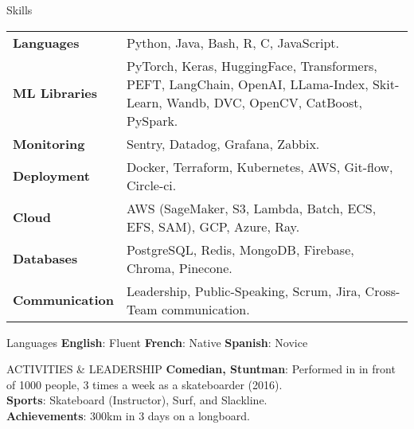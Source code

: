 \documentclass{resume}
\begin{document}
\begin{multicols}{2}
	\begin{rSection}{\Large Skills}
		\noindent
		 \setlength{\tabcolsep}{2pt}
    \begin{tabularx}{0.50\textwidth}{@{\textbullet\hspace{\labelsep}}lX}
        \textbf{Languages} & Python, Java, Bash, R, C, JavaScript. \\
        \textbf{ML Libraries} & PyTorch, Keras, HuggingFace, Transformers, PEFT, LangChain, OpenAI, LLama-Index, Skit-Learn, Wandb, DVC, OpenCV, CatBoost, PySpark. \\
        \textbf{Monitoring} & Sentry, Datadog, Grafana, Zabbix. \\
        \textbf{Deployment} & Docker, Terraform, Kubernetes, AWS, Git-flow, Circle-ci. \\
        \textbf{Cloud} & AWS (SageMaker, S3, Lambda, Batch, ECS, EFS, SAM), GCP, Azure, Ray. \\
        \textbf{Databases} & PostgreSQL, Redis, MongoDB, Firebase, Chroma, Pinecone. \\
        \textbf{Communication} & Leadership, Public-Speaking, Scrum, Jira, Cross-Team communication. \\
    \end{tabularx}
	\end{rSection}

	\begin{rSection}{\Large Languages}
		\textbf{English}:  Fluent \hspace{1ex} \textbf{French}: Native \hspace{1ex} \textbf{Spanish}:  Novice
	\end{rSection}

	\begin{rSection}{\Large ACTIVITIES \& LEADERSHIP}
		\textbf{Comedian, Stuntman}: Performed in  in front of 1000 people, 3 times a week as a skateboarder (2016).\\
		\textbf{Sports}: Skateboard (Instructor), Surf, and Slackline.\\
		\textbf{Achievements}: 300km in 3 days on a longboard.
	\end{rSection}
	
	\end{multicols}
\end{document}
